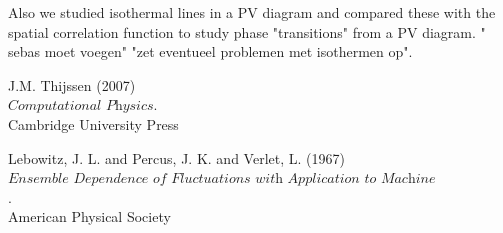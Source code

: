 \documentclass[12pt,a4paper]{report}
\begin{document}
Also we studied isothermal lines in a PV diagram and compared these with the spatial correlation function to study phase "transitions" from a PV diagram. " sebas moet voegen" "zet eventueel problemen met isothermen op".


\newpage
\begin{thebibliography}{9}

 J.M. Thijssen (2007)\\
 $\textit{Computational Physics}$.\\
 Cambridge University Press
 
 Lebowitz, J. L. and Percus, J. K. and Verlet, L. (1967)\\
 $\textit{Ensemble Dependence of Fluctuations with Application to Machine Computations}$.\\
 American Physical Society
 \end{thebibliography}
\end{document}
